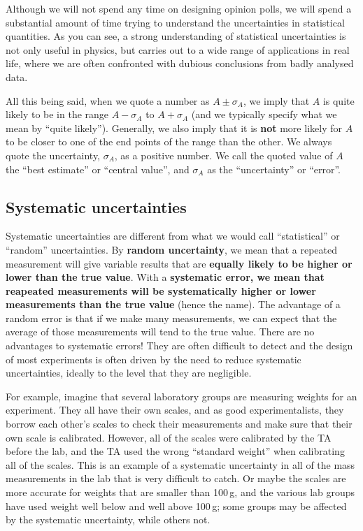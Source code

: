 Although we will not spend any time on designing opinion polls, we will spend a substantial amount of time trying to understand the uncertainties in statistical quantities. As you can see, a strong understanding of statistical uncertainties is not only useful in physics, but carries out to a wide range of applications in real life, where we are often confronted with dubious conclusions from badly analysed data.

All this being said, when we quote a number as $A\pm \sigma_A$, we imply that $A$ is quite likely to be in the range $A-\sigma_A$ to $A+\sigma_A$ (and we typically specify what we mean by ``quite likely''). Generally, we also imply that it is \textbf{not} more likely for $A$ to be closer to one of the end points of the range than the other. We always quote the uncertainty, $\sigma_A$, as a positive number. We call the quoted value of $A$ the ``best estimate'' or ``central value'', and $\sigma_A$ as the ``uncertainty'' or ``error''.

\subsection{Systematic uncertainties}

Systematic uncertainties are different from what we would call ``statistical'' or ``random'' uncertainties. By \textbf{random uncertainty}, we mean that a repeated measurement will give variable results that are \textbf{equally likely to be higher or lower than the true value}. With a \textbf{systematic error, we mean that reapeated measurements will be systematically higher or lower measurements than the true value} (hence the name). The advantage of a random error is that if we make many measurements, we can expect that the average of those measurements will tend to the true value. There are no advantages to systematic errors! They are often difficult to detect and the design of most experiments is often driven by the need to reduce systematic uncertainties, ideally to the level that they are negligible.

For example, imagine that several laboratory groups are measuring weights for an experiment. They all have their own scales, and as good experimentalists, they borrow each other's scales to check their measurements and make sure that their own scale is calibrated. However, all of the scales were calibrated by the TA before the lab, and the TA used the wrong ``standard weight'' when calibrating all of the scales. This is an example of a systematic uncertainty in all of the mass measurements in the lab that is very difficult to catch. Or maybe the scales are more accurate for weights that are smaller than 100\,g, and the various lab groups have used weight well below and well above 100\,g; some groups may be affected by the systematic uncertainty, while others not. 

